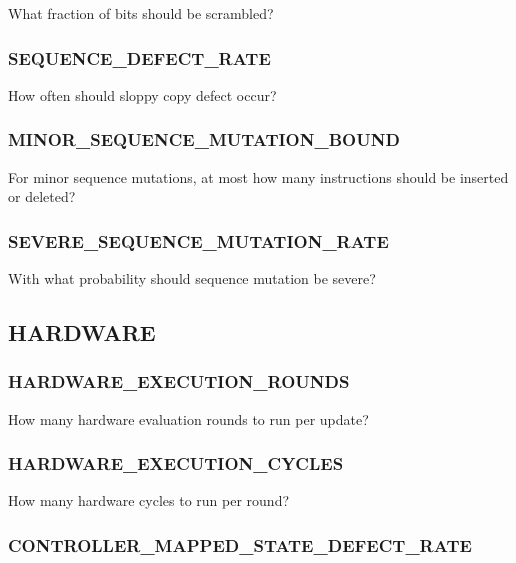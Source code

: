 
What fraction of bits should be scrambled?

\subsubsection{SEQUENCE\_DEFECT\_RATE}


How often should sloppy copy defect occur?

\subsubsection{MINOR\_SEQUENCE\_MUTATION\_BOUND}


For minor sequence mutations, at most how many instructions should be inserted or deleted?

\subsubsection{SEVERE\_SEQUENCE\_MUTATION\_RATE}


With what probability should sequence mutation be severe?

\subsection{HARDWARE}

\subsubsection{HARDWARE\_EXECUTION\_ROUNDS}


How many hardware evaluation rounds to run per update?

\subsubsection{HARDWARE\_EXECUTION\_CYCLES}


How many hardware cycles to run per round?

\subsubsection{CONTROLLER\_MAPPED\_STATE\_DEFECT\_RATE}

